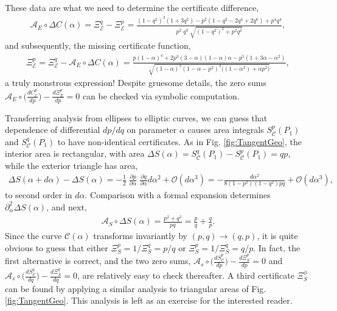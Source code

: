 \documentclass[nofootinbib,preprint]{revtex4-1}
\begin{document}
These data are what we need to determine the certificate difference,
\begin{eqnarray}
\mathcal{A}_{E} \circ \Delta C(\alpha) 
= \Xi^{q}_{\mathcal{E}}-\Xi^{p}_{\mathcal{E}} 
= \frac{(1-q^2)^3(1+3 q^2) - p^2(1-q^2-2 q^4+2 q^6) +p^4 q^4 
}{p^2 \; q^3 \; \sqrt{(1-q^2)^2+p^2 q^2}}, \nonumber 
\end{eqnarray}
and subsequently, the missing certificate function,
\begin{eqnarray}
\Xi^{p}_{\mathcal{E}} = \Xi^{q}_{\mathcal{E}}  - \mathcal{A}_{E} \circ \Delta C(\alpha) 
= \frac{p(1-\alpha)^4+2p^3(3-\alpha)(1-\alpha)\alpha - p^5(1+3\alpha-\alpha^2) 
}{ \sqrt{(1-\alpha)^3(1-\alpha-p^2)^3
\big((1-\alpha^2)+\alpha p^2\big)}}, \nonumber
\end{eqnarray}
a truly monstrous expression! Despite gruesome details, the zero sums 
$\mathcal{A}_E \circ \big(\frac{dC^{p}_{\mathcal{E}}}{dp}\big) - \frac{d\Xi_E^{p}}{dp} = 0$
can be checked via symbolic computation.

Transferring analysis from ellipses to elliptic curves, we can guess that 
dependence of differential $dp/dq$ on parameter $\alpha$ causes area integrals 
$S^{p}_{\mathcal{C}}(P_1)$ and $S^{q}_{\mathcal{C}}(P_1)$ to have non-identical 
certificates. As in Fig. \ref{fig:TangentGeo}, the interior area
is rectangular, with area 
${\Delta S(\alpha)= S^{q}_{\mathcal{C}}(P_1) - S^{p}_{\mathcal{C}}(P_1)=q p}$, 
while the exterior triangle has area,
\begin{eqnarray}
\Delta S(\alpha+d\alpha)-\Delta S(\alpha)
= - \frac{1}{2}\;\frac{\partial p}{\partial \alpha}
\;\frac{\partial q}{\partial \alpha} d\alpha^2 + \mathcal{O}(d\alpha^3)\nonumber 
= - \frac{d\alpha^2}{8 (1-p^2) (1-q^2) p q}  + \mathcal{O}(d\alpha^3), \nonumber
\end{eqnarray}
to second order in $d\alpha$. Comparison with a formal expansion determines 
 $\partial_{\alpha}^2\Delta S(\alpha)$, and next,
\begin{eqnarray}
\mathcal{A}_S \circ \Delta S(\alpha)  
=\frac{p^2+q^2}{p q}=\frac{p}{q}+\frac{q}{p}. \nonumber
\end{eqnarray}
Since the curve $\mathcal{C}(\alpha)$ transforms invariantly by
$(p,q) \rightarrow (q,p)$, it is quite obvious to guess that either 
$\Xi^{p}_S=1/\Xi^{q}_S=p/q$  or $\Xi^{p}_S=1/\Xi^{q}_S=q/p$.
In fact, the first alternative is correct, and the two zero sums,
$\mathcal{A}_s \circ \big(\frac{dS^{p}_{\mathcal{C}}}{dp}\big) - \frac{d\Xi_S^{p}}{dp} = 0$
and $\mathcal{A}_s \circ \big(\frac{dS^{q}_{\mathcal{C}}}{dq}\big) - \frac{d\Xi_S^{q}}{dq} = 0$,
are relatively easy to check thereafter. A third certificate $\Xi^{\phi}_S$ can be found
by applying a similar analysis to triangular areas of Fig. \ref{fig:TangentGeo}. This 
analysis is left as an exercise for the interested reader.
\end{document}
